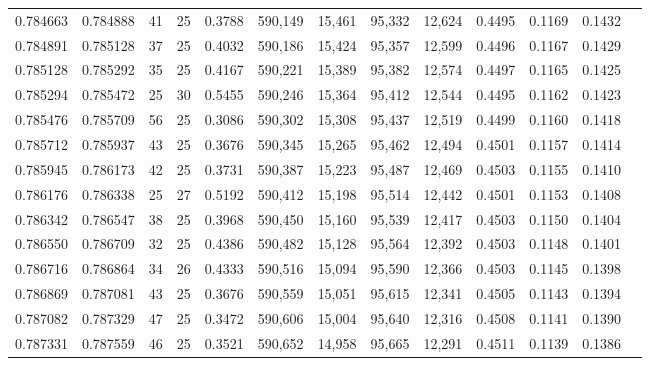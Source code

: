 \begin{tabular}{rrrrrrrrrrrrr}
0.784663 & 0.784888 &    41 &  25 &                                     0.3788 & 590,149 &  15,461 &  95,332 &  12,624 & 0.4495 & 0.1169 & 0.1432 \\
0.784891 & 0.785128 &    37 &  25 &                                     0.4032 & 590,186 &  15,424 &  95,357 &  12,599 & 0.4496 & 0.1167 & 0.1429 \\
0.785128 & 0.785292 &    35 &  25 &                                     0.4167 & 590,221 &  15,389 &  95,382 &  12,574 & 0.4497 & 0.1165 & 0.1425 \\
0.785294 & 0.785472 &    25 &  30 &                                     0.5455 & 590,246 &  15,364 &  95,412 &  12,544 & 0.4495 & 0.1162 & 0.1423 \\
0.785476 & 0.785709 &    56 &  25 &                                     0.3086 & 590,302 &  15,308 &  95,437 &  12,519 & 0.4499 & 0.1160 & 0.1418 \\
0.785712 & 0.785937 &    43 &  25 &                                     0.3676 & 590,345 &  15,265 &  95,462 &  12,494 & 0.4501 & 0.1157 & 0.1414 \\
0.785945 & 0.786173 &    42 &  25 &                                     0.3731 & 590,387 &  15,223 &  95,487 &  12,469 & 0.4503 & 0.1155 & 0.1410 \\
0.786176 & 0.786338 &    25 &  27 &                                     0.5192 & 590,412 &  15,198 &  95,514 &  12,442 & 0.4501 & 0.1153 & 0.1408 \\
0.786342 & 0.786547 &    38 &  25 &                                     0.3968 & 590,450 &  15,160 &  95,539 &  12,417 & 0.4503 & 0.1150 & 0.1404 \\
0.786550 & 0.786709 &    32 &  25 &                                     0.4386 & 590,482 &  15,128 &  95,564 &  12,392 & 0.4503 & 0.1148 & 0.1401 \\
0.786716 & 0.786864 &    34 &  26 &                                     0.4333 & 590,516 &  15,094 &  95,590 &  12,366 & 0.4503 & 0.1145 & 0.1398 \\
0.786869 & 0.787081 &    43 &  25 &                                     0.3676 & 590,559 &  15,051 &  95,615 &  12,341 & 0.4505 & 0.1143 & 0.1394 \\
0.787082 & 0.787329 &    47 &  25 &                                     0.3472 & 590,606 &  15,004 &  95,640 &  12,316 & 0.4508 & 0.1141 & 0.1390 \\
0.787331 & 0.787559 &    46 &  25 &                                     0.3521 & 590,652 &  14,958 &  95,665 &  12,291 & 0.4511 & 0.1139 & 0.1386 \\

\end{tabular}

